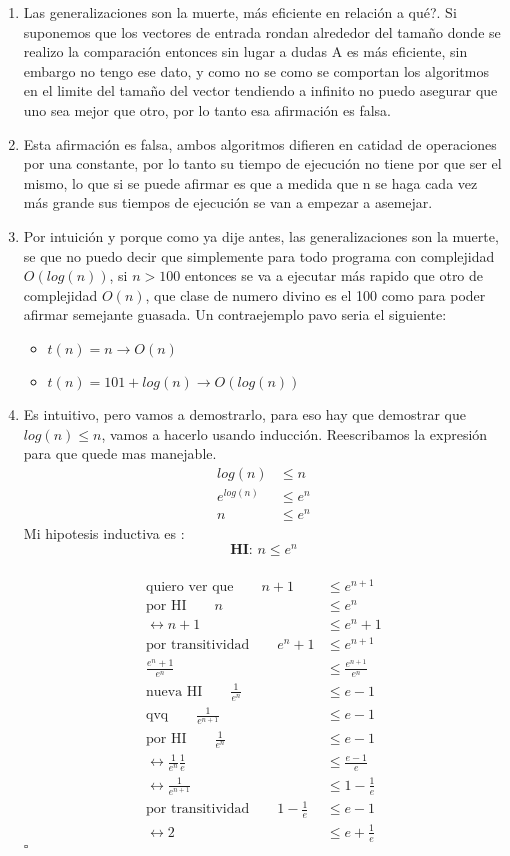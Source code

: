 \documentclass{article}
\begin{document}
\begin{enumerate}[label=\alph*)]
\item  Las generalizaciones son la muerte, más eficiente en relación a qué?.
 Si suponemos que los vectores de entrada rondan alrededor del tamaño donde se realizo la comparación
  entonces sin lugar a dudas A es más eficiente, sin embargo no tengo ese dato, y como no se como se comportan los algoritmos
   en el limite del tamaño del vector tendiendo a infinito no puedo asegurar que uno sea mejor que otro, por lo tanto esa afirmación es falsa.
\item Esta afirmación es falsa, ambos algoritmos difieren en catidad de operaciones por una constante, por lo tanto su tiempo de ejecución no tiene por que ser el mismo, lo que si se puede afirmar es que a medida que n se haga cada vez más grande sus tiempos de ejecución se van a empezar a asemejar.
\item Por intuición y porque como ya dije antes, las generalizaciones son la muerte, se que no puedo decir que simplemente para todo programa con complejidad $O(log(n))$, si $n>100$ entonces se va a ejecutar más rapido que otro de complejidad $O(n)$, que clase de numero divino es el 100 como para poder afirmar semejante guasada. Un contraejemplo pavo seria el siguiente:
\begin{itemize}
\item $t(n)= n \rightarrow O(n)$
\item $t(n)= 101+log(n) \rightarrow O(log(n))$
\end{itemize}
\item Es intuitivo, pero vamos a demostrarlo, para eso hay que demostrar que $log(n)\leq n$, vamos a hacerlo usando inducción. Reescribamos la expresión para que quede mas manejable.
\begin{align*}
log(n) &\leq n\\
e^{log(n)} &\leq e^n\\
n &\leq e^n
\end{align*}
Mi hipotesis inductiva es : $$\textbf{HI:\ }n \leq e^n$$ \\
\begin{align*}
\textrm{quiero ver que}\qquad n+1 &\leq e^{n+1}\\
\textrm{por HI}\qquad n &\leq e^n\\
\leftrightarrow n +1 &\leq e^n +1\\
\textrm{por transitividad}\qquad e^n +1 &\leq e^{n+1}\\
\frac{e^n +1}{e^n} &\leq \frac{e^{n+1}}{e^n}\\
\textrm{nueva HI}\qquad \frac{1}{e^n} &\leq e-1\\
\textrm{qvq}\qquad \frac{1}{e^{n+1}} &\leq e-1\\
\textrm{por HI}\qquad  \frac{1}{e^n} &\leq e-1\\
\leftrightarrow \frac{1}{e^n}\frac{1}{e} &\leq \frac{e-1}{e} \\
\leftrightarrow \frac{1}{e^{n+1}} &\leq 1-\frac{1}{e} \\
\textrm{por transitividad}\qquad 1-\frac{1}{e}&\leq e-1\\
\leftrightarrow 2 &\leq e+\frac{1}{e} 
\end{align*}$\square$


\end{enumerate}
\end{document}
